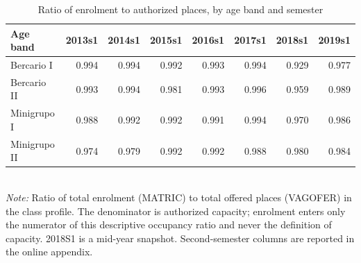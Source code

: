 \begin{table}[htbp]\centering
\caption{Ratio of enrolment to authorized places, by age band and semester}
\label{tab:T6b_ratio}
\small
\setlength{\tabcolsep}{4pt}
\begin{tabular}{lrrrrrrr}
\toprule
Age band & 2013s1 & 2014s1 & 2015s1 & 2016s1 & 2017s1 & 2018s1 & 2019s1 \\
\midrule
Bercario I & 0.994 & 0.994 & 0.992 & 0.993 & 0.994 & 0.929 & 0.977 \\
Bercario II & 0.993 & 0.994 & 0.981 & 0.993 & 0.996 & 0.959 & 0.989 \\
Minigrupo I & 0.988 & 0.992 & 0.992 & 0.991 & 0.994 & 0.970 & 0.986 \\
Minigrupo II & 0.974 & 0.979 & 0.992 & 0.992 & 0.988 & 0.980 & 0.984 \\
\bottomrule
\end{tabular}
\\[3pt]{\footnotesize \textit{Note:} Ratio of total enrolment (MATRIC) to total offered places (VAGOFER) in the class profile. The denominator is authorized capacity; enrolment enters only the numerator of this descriptive occupancy ratio and never the definition of capacity. 2018S1 is a mid-year snapshot. Second-semester columns are reported in the online appendix.}
\end{table}
